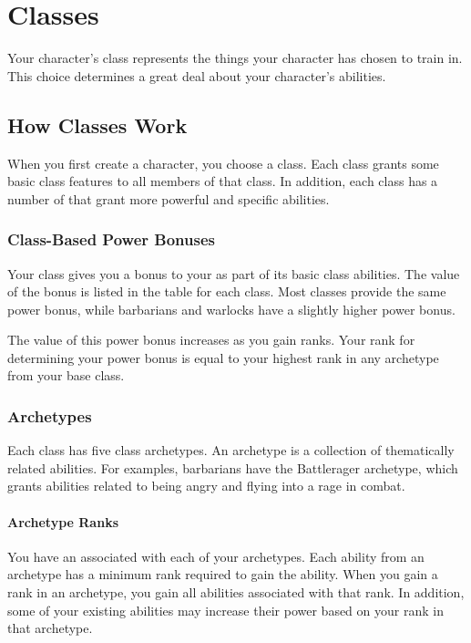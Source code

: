 \chapter{Classes}\label{Classes}

Your character's class represents the things your character has chosen to train in.
This choice determines a great deal about your character's abilities.

\section{How Classes Work}
    When you first create a character, you choose a class.
    Each class grants some basic class features to all members of that class.
    In addition, each class has a number of  that grant more powerful and specific abilities.

    \subsection{Class-Based Power Bonuses}\label{Class-Based Power Bonuses}
        Your class gives you a bonus to your  as part of its basic class abilities.
        The value of the bonus is listed in the table for each class.
        Most classes provide the same power bonus, while barbarians and warlocks have a slightly higher power bonus.

        The value of this power bonus increases as you gain ranks.
        Your rank for determining your power bonus is equal to your highest rank in any archetype from your base class.

    \subsection{Archetypes}\label{Archetypes}
        Each class has five class archetypes.
        An archetype is a collection of thematically related abilities.
        For examples, barbarians have the Battlerager archetype, which grants abilities related to being angry and flying into a rage in combat.

        \subsubsection{Archetype Ranks}\label{Archetype Ranks}
            You have an  associated with each of your archetypes.
            Each ability from an archetype has a minimum rank required to gain the ability.
            When you gain a rank in an archetype, you gain all abilities associated with that rank.
            In addition, some of your existing abilities may increase their power based on your rank in that archetype.

